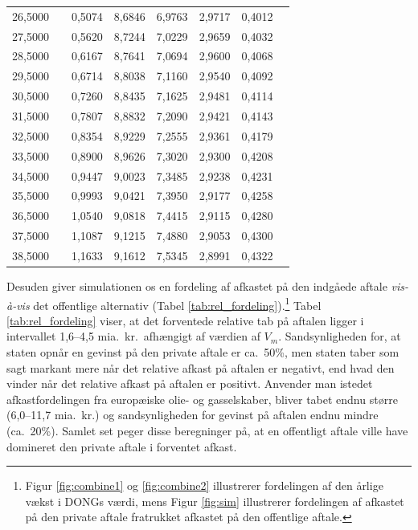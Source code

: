 \documentclass{article}
\begin{document}
\begin{table}[h]
\begin{center}
\begin{tabular}{cXcccccr}
 26{,}5000&&0{,}5074&8{,}6846&6{,}9763&2{,}9717&0{,}4012\\
 27{,}5000&&0{,}5620&8{,}7244&7{,}0229&2{,}9659&0{,}4032\\
 28{,}5000&&0{,}6167&8{,}7641&7{,}0694&2{,}9600&0{,}4068\\
 29{,}5000&&0{,}6714&8{,}8038&7{,}1160&2{,}9540&0{,}4092\\
 30{,}5000&&0{,}7260&8{,}8435&7{,}1625&2{,}9481&0{,}4114\\
 31{,}5000&&0{,}7807&8{,}8832&7{,}2090&2{,}9421&0{,}4143\\
 32{,}5000&&0{,}8354&8{,}9229&7{,}2555&2{,}9361&0{,}4179\\
 33{,}5000&&0{,}8900&8{,}9626&7{,}3020&2{,}9300&0{,}4208\\
 34{,}5000&&0{,}9447&9{,}0023&7{,}3485&2{,}9238&0{,}4231\\
 35{,}5000&&0{,}9993&9{,}0421&7{,}3950&2{,}9177&0{,}4258\\
 36{,}5000&&1{,}0540&9{,}0818&7{,}4415&2{,}9115&0{,}4280\\
 37{,}5000&&1{,}1087&9{,}1215&7{,}4880&2{,}9053&0{,}4300\\
 38{,}5000&&1{,}1633&9{,}1612&7{,}5345&2{,}8991&0{,}4322\\

\bottomrule[1pt]
	\end{tabular}
\end{center}
\end{table}

Desuden giver simulationen os en fordeling af afkastet på den indgåede aftale \emph{vis-\`{a}-vis} det offentlige alternativ (Tabel \ref{tab:rel_fordeling}).\footnote{Figur \ref{fig:combine1} og \ref{fig:combine2} illustrerer fordelingen af den årlige vækst i DONGs værdi, mens Figur \ref{fig:sim} illustrerer fordelingen af afkastet på den private aftale fratrukket afkastet på den offentlige aftale.} Tabel \ref{tab:rel_fordeling} viser, at det forventede relative tab på aftalen ligger i intervallet 1,6--4,5 mia.\ kr.\ afhængigt af værdien af $V_m$. Sandsynligheden for, at staten opnår en gevinst på den private aftale er ca.\ 50\%, men staten taber som sagt markant mere når det relative afkast på aftalen er negativt, end hvad den vinder når det relative afkast på aftalen er positivt. Anvender man istedet afkastfordelingen fra europæiske olie- og gasselskaber, bliver tabet endnu større (6,0--11,7 mia.\ kr.) og sandsynligheden for gevinst på aftalen endnu mindre (ca.\ 20\%). Samlet set peger disse beregninger på, at en offentligt aftale ville have domineret den private aftale i forventet afkast.
\end{document}
